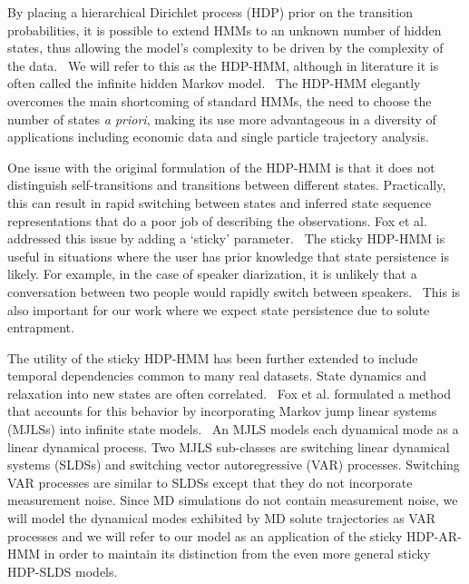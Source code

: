 \documentclass[journal=jpcbfk,manuscript=article]{achemso}
\begin{document}
  By placing a hierarchical Dirichlet process (HDP) prior on the transition 
  probabilities, it is possible to extend HMMs to an unknown number of hidden
  states, thus allowing the model's complexity to be driven by the complexity
  of the data.~\cite{teh_hierarchical_2006} We will refer to this as the HDP-HMM,
  although in literature it is often called the infinite hidden Markov 
  model.~\cite{beal_infinite_2002} The HDP-HMM elegantly overcomes the main
  shortcoming of standard HMMs, the need to choose the number of states 
  \textit{a priori}, making its use more advantageous in a diversity of 
  applications including economic data and single particle trajectory 
  analysis.~\cite{shi_identifying_2016,hines_analyzing_2015} 

  One issue with the original formulation of the HDP-HMM is that it does 
  not distinguish self-transitions and transitions between different states.
  Practically, this can result in rapid switching between states and inferred
  state sequence representations that do a poor job of describing the 
  observations. Fox et al. addressed this issue by adding a `sticky' 
  parameter.~\cite{fox_sticky_2007} The sticky HDP-HMM is useful in situations
  where the user has prior knowledge that state persistence is likely.
  For example, in the case of speaker diarization, it is unlikely that a 
  conversation between two people would rapidly switch between speakers.~\cite{fox_sticky_2011}
  This is also important for our work where we expect state persistence due
  to solute entrapment.   
  
  The utility of the sticky HDP-HMM has been further extended to include 
  temporal dependencies common to many real datasets. State dynamics and 
  relaxation into new states are often correlated.~\cite{calderon_data-driven_2014}
  Fox et al. formulated a method that accounts for this behavior by
  incorporating Markov jump linear systems (MJLSs) into infinite state 
  models.~\cite{fox_nonparametric_2009} An MJLS models each dynamical mode
  as a linear dynamical process. Two MJLS sub-classes are switching linear
  dynamical systems (SLDSs) and switching vector autoregressive (VAR) processes.
  Switching VAR processes are similar to SLDSs except that they do not
  incorporate measurement noise. Since MD simulations do not contain measurement
  noise, we will model the dynamical modes exhibited by MD solute trajectories 
  as VAR processes and we will refer to our model as an application of the 
  sticky HDP-AR-HMM in order to maintain its distinction from the even more
  general sticky HDP-SLDS models.
  
\end{document}

